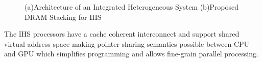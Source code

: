 \begin{figure}[!htb]
	\centering
	\def\svgwidth{0.48\columnwidth}
	
	\def\svgwidth{0.5\columnwidth}
	
	\caption{(a)Architecture of an Integrated Heterogeneous System (b)Proposed DRAM Stacking for IHS}
	\label{fig:hsa-arch}
\end{figure}

\par The IHS processors have a cache coherent interconnect and support shared virtual address space making pointer sharing semantics possible between CPU and GPU which simplifies programming and allows fine-grain parallel processing.

